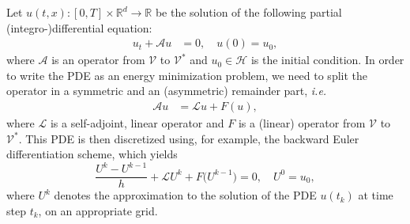 \documentclass[11pt,a4paper,reqno]{amsart}
\numberwithin{equation}{section}
\theoremstyle{plain}
\theoremstyle{definition}
\newcommand{\cL}{\mathcal{L}}
\begin{document}
Let $u \left( t, x \right) : \left[ 0, T \right] \times \mathbb{R}^{d} \to \mathbb{R}$ be the solution of the following partial (integro-)differential equation:
\begin{equation}
\label{eq:general_operator}
\begin{aligned}
u_t + \mathcal{A} u & = 0, \quad u(0) = u_0, 
\end{aligned}
\end{equation}
where $\mathcal{A}$ is an operator from $\mathcal V$ to $\mathcal V^*$ and $u_0\in\mathcal H$ is the initial condition.  
In order to write the PDE as an energy minimization problem, we need to split the operator in a symmetric and an (asymmetric) remainder part, \emph{i.e.}
\begin{equation}
\label{eq:operator}
\begin{aligned}
\mathcal{A} u & = \mathcal{L} u + F(u), 
\end{aligned}
\end{equation}
where $\mathcal{L}$ is a self-adjoint, linear operator and $F$ is a (linear) operator from $\mathcal{V}$ to $\mathcal V^*$. 
This PDE is then discretized using, for example, the backward Euler differentiation scheme, which yields
\[
\frac{U^k - U^{k - 1}}{h} + \mathcal{L} U^k + F \Big( U^{k - 1} \Big) = 0, \quad U^0  = u_0,
\]
where $U^k$ denotes the approximation to the solution of the PDE $u(t_k)$ at time step $t_k$, on an appropriate grid.
\end{document}
